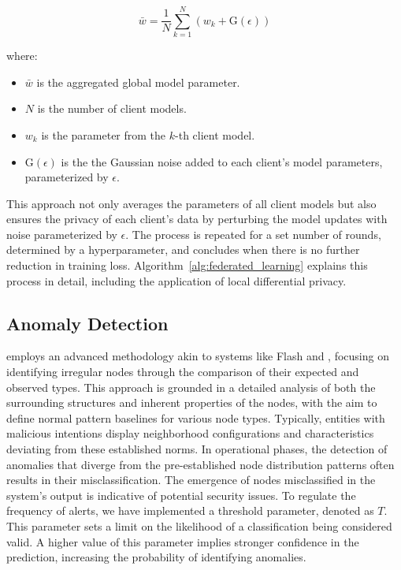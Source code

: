 \begin{equation}
\bar{w} = \frac{1}{N} \sum_{k=1}^{N} \left(w_k + \text{G}(\epsilon)\right)
\end{equation}

where:
\begin{itemize}
    \item \(\bar{w}\) is the aggregated global model parameter.
    \item \(N\) is the number of client models.
    \item \(w_k\) is the parameter from the \(k\)-th client model.
    \item \(\text{G}(\epsilon)\) is the the Gaussian noise added to each client's model parameters, parameterized by \(\epsilon\).
\end{itemize}

This approach not only averages the parameters of all client models but also ensures the privacy of each client's data by perturbing the model updates with noise parameterized by \(\epsilon\). The process is repeated for a set number of rounds, determined by a hyperparameter, and concludes when there is no further reduction in training loss. Algorithm~\ref{alg:federated_learning} explains this process in detail, including the application of local differential privacy.

\subsection{Anomaly Detection}
\Sys employs an advanced methodology akin to systems like Flash and \threatrace, focusing on identifying irregular nodes through the comparison of their expected and observed types. This approach is grounded in a detailed analysis of both the surrounding structures and inherent properties of the nodes, with the aim to define normal pattern baselines for various node types. Typically, entities with malicious intentions display neighborhood configurations and characteristics deviating from these established norms. In operational phases, the detection of anomalies that diverge from the pre-established node distribution patterns often results in their misclassification. The emergence of nodes misclassified in the system's output is indicative of potential security issues. To regulate the frequency of alerts, we have implemented a threshold parameter, denoted as $T$. This parameter sets a limit on the likelihood of a classification being considered valid. A higher value of this parameter implies stronger confidence in the prediction, increasing the probability of identifying anomalies.

